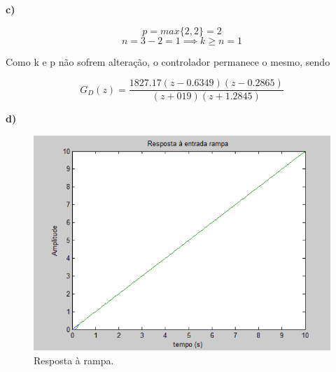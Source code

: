\documentclass{article}
\begin{document}
    {\textbf{c)}}

    $$ p = max\{ 2,2 \} = 2 $$
    $$ n = 3-2 = 1 \implies k \geq n = 1 $$

    {Como k e p não sofrem alteração, o controlador permanece o mesmo, sendo}

    $$ G_{D}(z) = \frac{ 1827.17(z-0.6349)(z-0.2865) }{ (z+019)(z+1.2845) } $$


    {\textbf{d)}}

    \begin{figure}[H]
       \centering
            \includegraphics[width=.6\linewidth]{images/grafico2d.png}
            \caption{Resposta à rampa.}
            \label{fig:graph2d}
    \end{figure}
\end{document}

